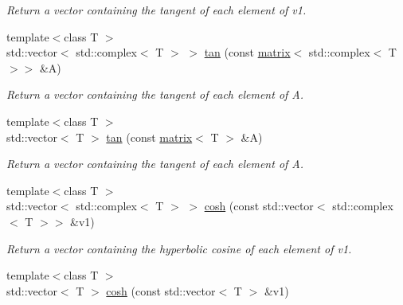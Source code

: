 \begin{DoxyCompactItemize}
\begin{DoxyCompactList}\small\item\em Return a vector containing the tangent of each element of v1. \end{DoxyCompactList}\item 
\hypertarget{namespacekeycpp_a6a91266a8d14f0ae2de1d3e098d05e41}{{\footnotesize template$<$class T $>$ }\\std\-::vector$<$ std\-::complex$<$ T $>$ $>$ \hyperlink{namespacekeycpp_a6a91266a8d14f0ae2de1d3e098d05e41}{tan} (const \hyperlink{classkeycpp_1_1matrix}{matrix}$<$ std\-::complex$<$ T $>$$>$ \&A)}\label{namespacekeycpp_a6a91266a8d14f0ae2de1d3e098d05e41}

\begin{DoxyCompactList}\small\item\em Return a vector containing the tangent of each element of A. \end{DoxyCompactList}\item 
\hypertarget{namespacekeycpp_aa8cf9e0ed2f49b902c93be19ea6ef147}{{\footnotesize template$<$class T $>$ }\\std\-::vector$<$ T $>$ \hyperlink{namespacekeycpp_aa8cf9e0ed2f49b902c93be19ea6ef147}{tan} (const \hyperlink{classkeycpp_1_1matrix}{matrix}$<$ T $>$ \&A)}\label{namespacekeycpp_aa8cf9e0ed2f49b902c93be19ea6ef147}

\begin{DoxyCompactList}\small\item\em Return a vector containing the tangent of each element of A. \end{DoxyCompactList}\item 
\hypertarget{namespacekeycpp_ae8ce29f6b9a95792764fcffc175ffc2a}{{\footnotesize template$<$class T $>$ }\\std\-::vector$<$ std\-::complex$<$ T $>$ $>$ \hyperlink{namespacekeycpp_ae8ce29f6b9a95792764fcffc175ffc2a}{cosh} (const std\-::vector$<$ std\-::complex$<$ T $>$$>$ \&v1)}\label{namespacekeycpp_ae8ce29f6b9a95792764fcffc175ffc2a}

\begin{DoxyCompactList}\small\item\em Return a vector containing the hyperbolic cosine of each element of v1. \end{DoxyCompactList}\item 
\hypertarget{namespacekeycpp_a227b4df07d8fb2beb7f8b63408345caf}{{\footnotesize template$<$class T $>$ }\\std\-::vector$<$ T $>$ \hyperlink{namespacekeycpp_a227b4df07d8fb2beb7f8b63408345caf}{cosh} (const std\-::vector$<$ T $>$ \&v1)}\label{namespacekeycpp_a227b4df07d8fb2beb7f8b63408345caf}


\end{DoxyCompactItemize}
